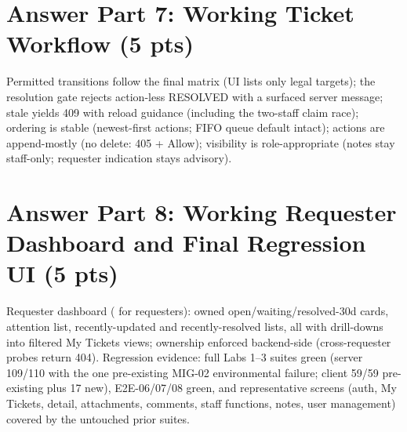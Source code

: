 \documentclass[11pt,a4paper]{article}
\begin{document}

\section*{Answer Part 7: Working Ticket Workflow (5 pts)}

Permitted transitions follow the final matrix (UI lists only legal targets); the
resolution gate rejects action-less RESOLVED with a surfaced server message; stale
 yields 409 with reload guidance (including the two-staff claim
race); ordering is stable (newest-first actions; FIFO queue default intact); actions are
append-mostly (no delete: 405 + Allow); visibility is role-appropriate (notes stay
staff-only; requester indication stays advisory).

\section*{Answer Part 8: Working Requester Dashboard and Final Regression UI (5 pts)}

Requester dashboard ( for requesters): owned open/waiting/resolved-30d
cards, attention list, recently-updated and recently-resolved lists, all with drill-downs
into filtered My Tickets views; ownership enforced backend-side (cross-requester probes
return 404). Regression evidence: full Labs 1--3 suites green (server 109/110 with the
one pre-existing MIG-02 environmental failure; client 59/59 pre-existing plus 17 new),
E2E-06/07/08 green, and representative screens (auth, My Tickets, detail, attachments,
comments, staff functions, notes, user management) covered by the untouched prior suites.

\end{document}
